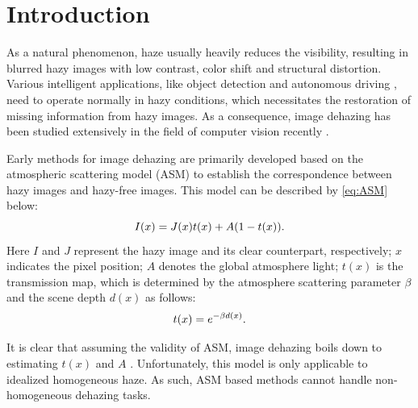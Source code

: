 \documentclass[10pt,twocolumn,letterpaper]{article}
\begin{document}
\section{Introduction}
\label{sec:intro}
As a natural phenomenon, haze usually heavily reduces the visibility, resulting in blurred hazy images with low contrast, color shift and structural distortion. Various intelligent applications, like object detection \cite{object-detection} and autonomous driving \cite{auto-driving}, need to operate normally in hazy conditions, which necessitates the restoration of missing information from hazy images. As a consequence, image dehazing has been studied extensively in the field of computer vision recently \cite{14,23,28,30,36,38,43,44,47,contrast2022,frequencydehazing2022}.

Early methods for image dehazing \cite{scatterdehaze1,scatterdehaze2} are primarily developed based on the atmospheric scattering model (ASM) \cite{ASM} to establish the correspondence between hazy images and hazy-free images. This model can be described by \cref{eq:ASM} below:
\begin{equation}
\setlength\abovedisplayskip{2pt}%
\setlength\belowdisplayskip{2pt}
  I(x) = J(x)t(x) + A(1-t(x)).
  \label{eq:ASM}
\end{equation}
Here $I$ and $J$ represent the hazy image and its clear counterpart, respectively; $x$ indicates the pixel position; $A$ denotes the global atmosphere light; $t(x)$ is the transmission map, which is determined by the atmosphere scattering parameter $\beta$ and the scene depth $d(x)$ as follows:
\begin{equation}
\setlength\abovedisplayskip{3pt}%
\setlength\belowdisplayskip{3pt}
  t(x)=e^{-\beta d(x)}.
  \label{eq:transmission map}
\end{equation}

It is clear that assuming the validity of ASM, image dehazing boils down to estimating $t(x)$ and $A$ \cite{scatterdehaze2,23,31}. Unfortunately, this model is only applicable to idealized homogeneous haze. As such, ASM based methods cannot handle non-homogeneous dehazing tasks.


\end{document}
